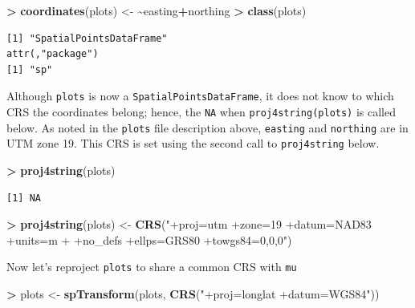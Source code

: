 \documentclass[
]{krantz}
\makeatletter
\newenvironment{Shaded}{\begin{snugshade}}{\end{snugshade}}
\newcommand{\ErrorTok}[1]{\textcolor[rgb]{0.14,0.14,0.14}{\textbf{#1}}}
\newcommand{\KeywordTok}[1]{\textcolor[rgb]{0.27,0.27,0.27}{\textbf{#1}}}
\newcommand{\NormalTok}[1]{#1}
\newcommand{\OperatorTok}[1]{\textcolor[rgb]{0.43,0.43,0.43}{\textbf{#1}}}
\newcommand{\StringTok}[1]{\textcolor[rgb]{0.5,0.5,0.5}{#1}}
\newenvironment{kframe}{%
\medskip{}
\setlength{\fboxsep}{.8em}
 \def\at@end@of@kframe{}%
 \ifinner\ifhmode%
  \def\at@end@of@kframe{\end{minipage}}%
  \begin{minipage}{\columnwidth}%
 \fi\fi%
 \def\FrameCommand##1{\hskip\@totalleftmargin \hskip-\fboxsep
 \colorbox{shadecolor}{##1}\hskip-\fboxsep
     \hskip-\linewidth \hskip-\@totalleftmargin \hskip\columnwidth}%
 \MakeFramed {\advance\hsize-\width
   \@totalleftmargin\z@ \linewidth\hsize
   \@setminipage}}%
 {\par\unskip\endMakeFramed%
 \at@end@of@kframe}
\renewenvironment{Shaded}{\begin{kframe}}{\end{kframe}}
\makeatother
\begin{document}
\begin{Shaded}
\begin{Highlighting}[]
\OperatorTok{\textgreater{}}\StringTok{ }\KeywordTok{coordinates}\NormalTok{(plots) \textless{}{-}}\StringTok{ }\ErrorTok{\textasciitilde{}}\NormalTok{easting}\OperatorTok{+}\NormalTok{northing}
\OperatorTok{\textgreater{}}\StringTok{ }\KeywordTok{class}\NormalTok{(plots)}
\end{Highlighting}
\end{Shaded}

\begin{verbatim}
[1] "SpatialPointsDataFrame"
attr(,"package")
[1] "sp"
\end{verbatim}

Although \texttt{plots} is now a \texttt{SpatialPointsDataFrame}, it does not know to which CRS the coordinates belong; hence, the \texttt{NA} when \texttt{proj4string(plots)} is called below. As noted in the \texttt{plots} file description above, \texttt{easting} and \texttt{northing} are in UTM zone 19. This CRS is set using the second call to \texttt{proj4string} below.

\begin{Shaded}
\begin{Highlighting}[]
\OperatorTok{\textgreater{}}\StringTok{ }\KeywordTok{proj4string}\NormalTok{(plots)}
\end{Highlighting}
\end{Shaded}

\begin{verbatim}
[1] NA
\end{verbatim}

\begin{Shaded}
\begin{Highlighting}[]
\OperatorTok{\textgreater{}}\StringTok{ }\KeywordTok{proj4string}\NormalTok{(plots) \textless{}{-}}\StringTok{ }\KeywordTok{CRS}\NormalTok{(}\StringTok{"+proj=utm +zone=19 +datum=NAD83 +units=m }
\StringTok{+                              +no\_defs +ellps=GRS80 +towgs84=0,0,0"}\NormalTok{)                   }
\end{Highlighting}
\end{Shaded}

Now let's reproject \texttt{plots} to share a common CRS with \texttt{mu}

\begin{Shaded}
\begin{Highlighting}[]
\OperatorTok{\textgreater{}}\StringTok{ }\NormalTok{plots \textless{}{-}}\StringTok{ }\KeywordTok{spTransform}\NormalTok{(plots, }\KeywordTok{CRS}\NormalTok{(}\StringTok{"+proj=longlat +datum=WGS84"}\NormalTok{))}
\end{Highlighting}
\end{Shaded}
\end{document}
